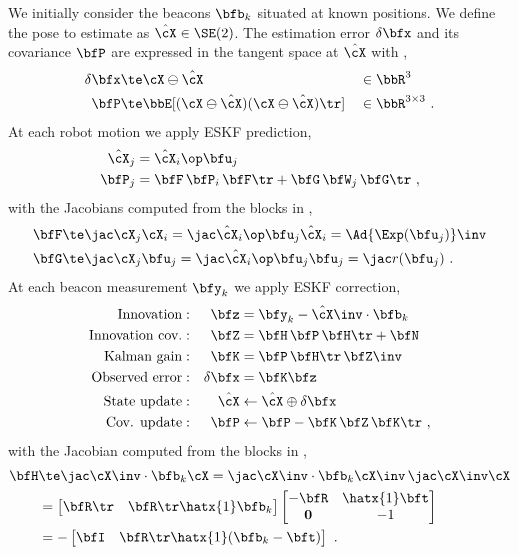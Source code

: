 We initially consider the beacons $\bfb_k$ situated at known positions. 
We define the pose to estimate as $\hat\cX\in\SE(2)$. 
The estimation error $\dx$ and its covariance $\bfP$ are expressed in the tangent space at $\hat\cX$ with , 
%
\begin{align}\label{equ:loc_Gaussian}
\dx &\te \cX\ominus\hat\cX && \in\bbR^3
\\
\bfP &\te \bbE[(\cX\ominus\hat\cX)(\cX\ominus\hat\cX)\tr]&& \in\bbR^{3\times3}
~.
\end{align}
%
At each robot motion we apply ESKF prediction,
%
\begin{align}
\hat\cX_j &= \hat\cX_i\op\bfu_j \label{equ:loc_ekf_pred}
\\
\bfP_j &= \bfF\,\bfP_i\,\bfF\tr + \bfG\,\bfW_j\,\bfG\tr
~,
\end{align}
%
with the Jacobians 
computed from the blocks in , 
%
\begin{align*}
\bfF &\te \mjac{\cX_j}{\cX_i} = \mjac{\hat\cX_i\op\bfu_j}{\hat\cX_i} 
= \Ad{\Exp(\bfu_j)}\inv
\\
\bfG &\te \mjac{\cX_j}{\bfu_j} = \mjac{\hat\cX_i\op\bfu_j}{\bfu_j} = \mjac{}{r}(\bfu_j)
~.
\end{align*}
%
At each beacon measurement $\bfy_k$ we apply ESKF correction,
%
\begin{align}
\textrm{Innovation}&:&\bfz &= \bfy_k - \hat\cX\inv\cdot\bfb_k \notag\\
\textrm{Innovation cov.}&:&\bfZ &= \bfH\,\bfP\,\bfH\tr+\bfN \notag\\
\textrm{Kalman gain}&:&\bfK &= \bfP\,\bfH\tr\,\bfZ\inv \notag\\
\textrm{Observed error}&:&\dx &= \bfK\bfz \notag\\
\textrm{State update}&:&\hat\cX &\gets \hat\cX \oplus \dx \label{equ:loc_ekf_corr}\\
\textrm{Cov. update}&:&\bfP &\gets \bfP - \bfK\,\bfZ\,\bfK\tr
~,
\end{align}
%
with the Jacobian computed from the blocks in , 
%
\begin{align*}
\bfH 
&\te \mjac{\cX\inv\cdot\bfb_k}{\cX}= \mjac{\cX\inv\cdot\bfb_k}{\cX\inv}\,\mjac{\cX\inv}{\cX} 
\notag\\
&= 
\begin{bmatrix}\bfR\tr & \bfR\tr\hatx{1}\bfb_k\end{bmatrix}
\begin{bmatrix}
-\bfR & \hatx{1}\bft \\ \bf0 & -1
\end{bmatrix}
\notag\\
&=
-\begin{bmatrix}\bfI & \bfR\tr\hatx{1}(\bfb_k-\bft)\end{bmatrix}
~.
\end{align*}

